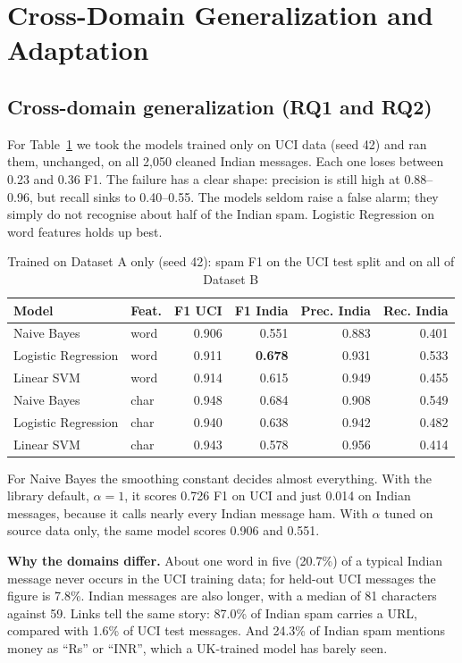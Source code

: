 \section{Cross-Domain Generalization and Adaptation}
\subsection{Cross-domain generalization (RQ1 and RQ2)}
For Table~\ref{tab:cross} we took the models trained only on UCI data (seed 42) and ran them, unchanged, on all 2,050 cleaned Indian messages. Each one loses between 0.23 and 0.36 F1. The failure has a clear shape: precision is still high at 0.88--0.96, but recall sinks to 0.40--0.55. The models seldom raise a false alarm; they simply do not recognise about half of the Indian spam. Logistic Regression on word features holds up best.

\begin{table}[H]
\centering
\caption{Trained on Dataset A only (seed 42): spam F1 on the UCI test split and on all of Dataset B}
\label{tab:cross}
\begin{tabular}{|l|l|r|r|r|r|}
\hline
\textbf{Model} & \textbf{Feat.} & \textbf{F1 UCI} & \textbf{F1 India} & \textbf{Prec. India} & \textbf{Rec. India} \\
\hline
Naive Bayes & word & 0.906 & 0.551 & 0.883 & 0.401 \\
\hline
Logistic Regression & word & 0.911 & \textbf{0.678} & 0.931 & 0.533 \\
\hline
Linear SVM & word & 0.914 & 0.615 & 0.949 & 0.455 \\
\hline
Naive Bayes & char & 0.948 & 0.684 & 0.908 & 0.549 \\
\hline
Logistic Regression & char & 0.940 & 0.638 & 0.942 & 0.482 \\
\hline
Linear SVM & char & 0.943 & 0.578 & 0.956 & 0.414 \\
\hline
\end{tabular}
\end{table}

For Naive Bayes the smoothing constant decides almost everything. With the library default, $\alpha=1$, it scores 0.726 F1 on UCI and just 0.014 on Indian messages, because it calls nearly every Indian message ham. With $\alpha$ tuned on source data only, the same model scores 0.906 and 0.551.

\textbf{Why the domains differ.} About one word in five (20.7\%) of a typical Indian message never occurs in the UCI training data; for held-out UCI messages the figure is 7.8\%. Indian messages are also longer, with a median of 81 characters against 59. Links tell the same story: 87.0\% of Indian spam carries a URL, compared with 1.6\% of UCI test messages. And 24.3\% of Indian spam mentions money as ``Rs'' or ``INR'', which a UK-trained model has barely seen.


